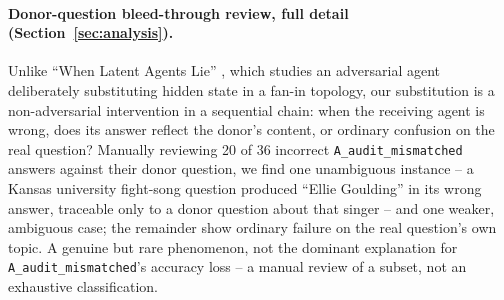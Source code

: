 \documentclass[11pt]{article}
\begin{document}
\paragraph{Donor-question bleed-through review, full detail
(Section~\ref{sec:analysis}).} Unlike ``When Latent Agents Lie''
\citep{latentagentslie2026}, which studies an adversarial agent
deliberately substituting hidden state in a fan-in topology, our
substitution is a non-adversarial intervention in a sequential chain:
when the receiving agent is wrong, does its answer reflect the donor's
content, or ordinary confusion on the real question? Manually reviewing
20 of 36 incorrect \texttt{A\_audit\_mismatched} answers against their
donor question, we find one unambiguous instance -- a Kansas university
fight-song question produced ``Ellie Goulding'' in its wrong answer,
traceable only to a donor question about that singer -- and one weaker,
ambiguous case; the remainder show ordinary failure on the real
question's own topic. A genuine but rare phenomenon, not the dominant
explanation for \texttt{A\_audit\_mismatched}'s accuracy loss -- a manual
review of a subset, not an exhaustive classification.
\end{document}
